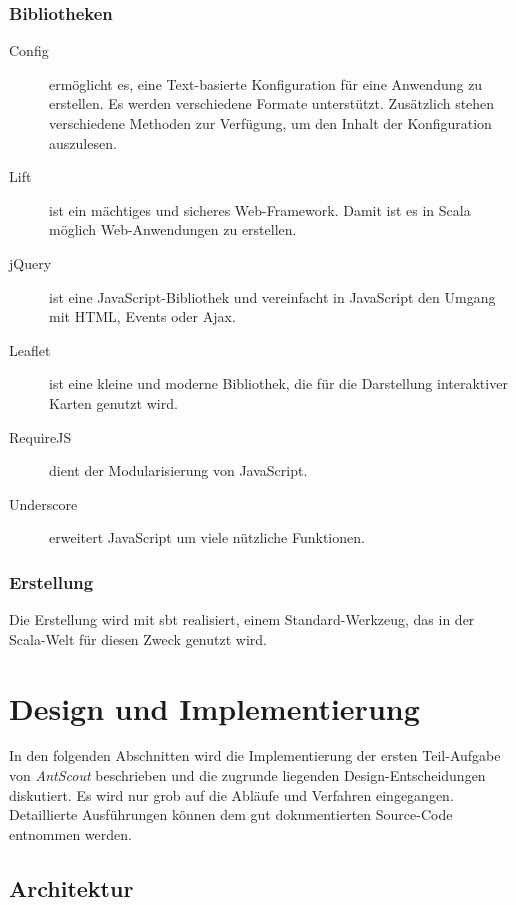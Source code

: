\subsubsection{Bibliotheken}
\label{sec:bibliotheken}

\begin{description}
  \item[Config] ermöglicht es, eine Text-basierte Konfiguration für eine Anwendung zu erstellen.
    Es werden verschiedene Formate unterstützt.
    Zusätzlich stehen verschiedene Methoden zur Verfügung, um den Inhalt der Konfiguration auszulesen.
  \item[Lift] ist ein mächtiges und sicheres Web-Framework.
    Damit ist es in Scala möglich Web-Anwendungen zu erstellen.
  \item[jQuery] ist eine JavaScript-Bibliothek und vereinfacht in JavaScript den Umgang mit HTML, Events oder Ajax.
  \item[Leaflet] ist eine kleine und moderne Bibliothek, die für die Darstellung interaktiver Karten genutzt wird.
  \item[RequireJS] dient der Modularisierung von JavaScript.
  \item[Underscore] erweitert JavaScript um viele nützliche Funktionen.
\end{description}

\subsubsection{Erstellung}
\label{sec:erstellung}

Die Erstellung wird mit \gls{sbt} realisiert, einem Standard-Werkzeug, das in der Scala-Welt für diesen Zweck genutzt wird.

\section{Design und Implementierung}
\label{sec:design-und-implementierung}

In den folgenden Abschnitten wird die Implementierung der ersten Teil-Aufgabe von \textit{AntScout} beschrieben und die zugrunde liegenden Design-Entscheidungen diskutiert.
Es wird nur grob auf die Abläufe und Verfahren eingegangen.
Detaillierte Ausführungen können dem gut dokumentierten Source-Code entnommen werden.

\subsection{Architektur}
\label{sec:architektur}

